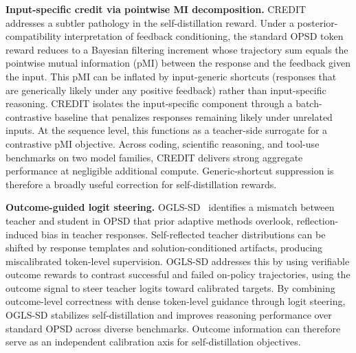 \documentclass{article} %
\begin{document}
\textbf{Input-specific credit via pointwise MI decomposition.} CREDIT~\citep{2605.11613} addresses a subtler pathology in the self-distillation reward. Under a posterior-compatibility interpretation of feedback conditioning, the standard OPSD token reward reduces to a Bayesian filtering increment whose trajectory sum equals the pointwise mutual information (pMI) between the response and the feedback given the input. This pMI can be inflated by input-generic shortcuts (responses that are generically likely under any positive feedback) rather than input-specific reasoning. CREDIT isolates the input-specific component through a batch-contrastive baseline that penalizes responses remaining likely under unrelated inputs. At the sequence level, this functions as a teacher-side surrogate for a contrastive pMI objective. Across coding, scientific reasoning, and tool-use benchmarks on two model families, CREDIT delivers strong aggregate performance at negligible additional compute. Generic-shortcut suppression is therefore a broadly useful correction for self-distillation rewards.

\textbf{Outcome-guided logit steering.} OGLS-SD~\citep{2605.12400} identifies a mismatch between teacher and student in OPSD that prior adaptive methods overlook, reflection-induced bias in teacher responses. Self-reflected teacher distributions can be shifted by response templates and solution-conditioned artifacts, producing miscalibrated token-level supervision. OGLS-SD addresses this by using verifiable outcome rewards to contrast successful and failed on-policy trajectories, using the outcome signal to steer teacher logits toward calibrated targets. By combining outcome-level correctness with dense token-level guidance through logit steering, OGLS-SD stabilizes self-distillation and improves reasoning performance over standard OPSD across diverse benchmarks. Outcome information can therefore serve as an independent calibration axis for self-distillation objectives.
\end{document}
